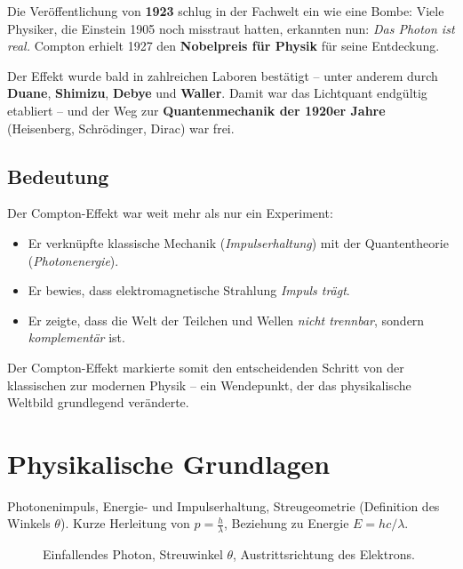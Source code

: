 \documentclass[12pt,oneside]{scrartcl}
\begin{document}
Die Veröffentlichung von \textbf{1923} schlug in der Fachwelt ein wie eine Bombe:  
Viele Physiker, die Einstein 1905 noch misstraut hatten, erkannten nun: \emph{Das Photon ist real.}  
Compton erhielt 1927 den \textbf{Nobelpreis für Physik} für seine Entdeckung.  

Der Effekt wurde bald in zahlreichen Laboren bestätigt – unter anderem durch \textbf{Duane}, \textbf{Shimizu}, \textbf{Debye} und \textbf{Waller}.  
Damit war das Lichtquant endgültig etabliert – und der Weg zur \textbf{Quantenmechanik der 1920er Jahre} 
(Heisenberg, Schrödinger, Dirac) war frei.

\vspace{1em}
\subsection{Bedeutung}

Der Compton-Effekt war weit mehr als nur ein Experiment:

\begin{itemize}
	\item Er verknüpfte klassische Mechanik (\emph{Impulserhaltung}) mit der Quantentheorie (\emph{Photonenergie}).
	\item Er bewies, dass elektromagnetische Strahlung \emph{Impuls trägt}.
	\item Er zeigte, dass die Welt der Teilchen und Wellen \emph{nicht trennbar}, sondern \emph{komplementär} ist.
\end{itemize}

Der Compton-Effekt markierte somit den entscheidenden Schritt von der klassischen zur modernen Physik – 
ein Wendepunkt, der das physikalische Weltbild grundlegend veränderte.

	
	\section{Physikalische Grundlagen}
	Photonenimpuls, Energie- und Impulserhaltung, Streugeometrie (Definition des Winkels $\theta$). 
	Kurze Herleitung von $p=\tfrac{h}{\lambda}$, Beziehung zu Energie $E=hc/\lambda$.
	
	\begin{figure}[h]
		\centering
		\caption{Einfallendes Photon, Streuwinkel $\theta$, Austrittsrichtung des Elektrons.}
		\label{fig:geometry}
	\end{figure}
	
\end{document}
